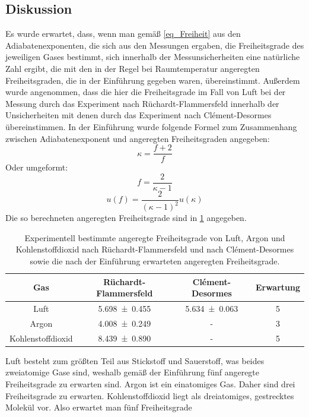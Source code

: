\documentclass[
	a4paper,
	12pt,
	pagesize,
	ngerman
]{scrartcl}
\begin{document}
	\subsection{Diskussion}
	
	Es wurde erwartet, dass, wenn man gemäß \cref{eq_Freiheit} aus den Adiabatenexponenten, die sich aus den Messungen ergaben, die Freiheitsgrade des jeweiligen Gases bestimmt, sich innerhalb der Messunsicherheiten eine natürliche Zahl ergibt, die mit den in der Regel bei Raumtemperatur angeregten Freiheitsgraden, die in der Einführung gegeben waren, übereinstimmt. %
	Außerdem wurde angenommen, dass die hier die Freiheitsgrade im Fall von Luft bei der Messung durch das Experiment nach Rüchardt-Flammersfeld innerhalb der Unsicherheiten mit denen durch das Experiment nach Clément-Desormes übereinstimmen.
	In der Einführung wurde folgende Formel zum Zusammenhang zwischen Adiabatenexponent und angeregten Freiheitsgraden angegeben:
	\begin{equation}
		\kappa = \frac{f+2}{f}
	\end{equation}
	Oder umgeformt:
	\begin{equation}
		f = \frac{2}{\kappa -1}
		\label{eq_Freiheit}
	\end{equation}
	\begin{equation}
	u(f) = \frac{2}{(\kappa -1)^2} u(\kappa) 
	\end{equation}
	Die so berechneten angeregten Freiheitsgrade sind in \cref{tab_Freiheit} angegeben.
	
	\begin{table}[H]
		\centering
		\begin{tabular}{ c | c | c | c }
			Gas & Rüchardt-Flammersfeld  & Clément-Desormes & Erwartung \\ \hline
			Luft & \SI{5,698 \pm 0,455}{} & \SI{5,634 \pm 0,063}{} & 5\\
			Argon & \SI{4,008 \pm 0,249}{} & - & 3\\
			Kohlenstoffdioxid & \SI{8,439 \pm 0,890}{} & - & 5\\
		\end{tabular}
		\caption{Experimentell bestimmte angeregte Freiheitsgrade von Luft, Argon und Kohlenstoffdioxid nach Rüchardt-Flammersfeld und nach Clément-Desormes sowie die nach der Einführung erwarteten angeregten Freiheitsgrade.}
		\label{tab_Freiheit}
	
	Luft besteht zum größten Teil aus Stickstoff und Sauerstoff, was beides zweiatomige Gase sind, weshalb gemäß der Einführung fünf angeregte Freiheitsgrade zu erwarten sind.
	Argon ist ein einatomiges Gas. %
	Daher sind drei Freiheitsgrade zu erwarten.
	Kohlenstoffdioxid liegt als dreiatomiges, gestrecktes Molekül vor.
	Also erwartet man fünf Freiheitsgrade
	\end{table}
	
\end{document}
